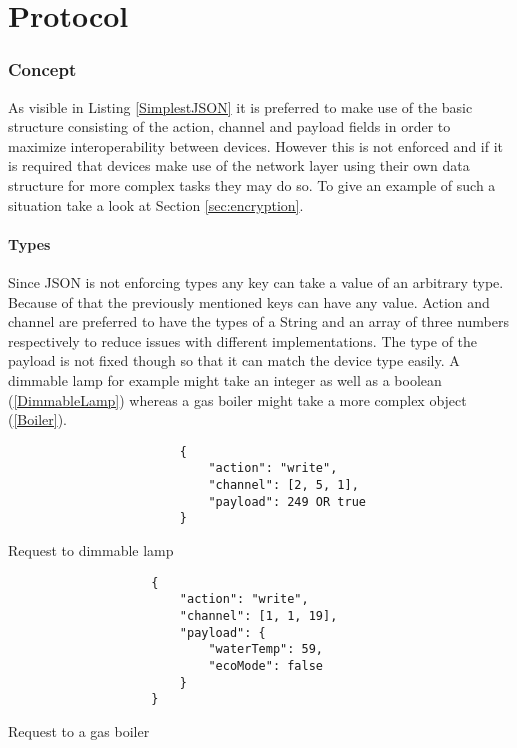 \documentclass[11pt,a4paper, titlepage]{article}
\begin{document}
	\newpage
				
	\part{Protocol}
		\label{part:protocol}
		
		\section{Concept}
			As visible in Listing \ref{SimplestJSON} it is preferred to make use of the basic structure consisting of the action, channel and payload fields in order to maximize interoperability between devices. However this is not enforced and if it is required that devices make use of the network layer using their own data structure for more complex tasks they may do so. To give an example of such a situation take a look at Section \ref{sec:encryption}.
			\subsection{Types}
				Since JSON is not enforcing types any key can take a value of an arbitrary type. Because of that the previously mentioned keys can have any value. Action and channel are preferred to have the types of a String and an array of three numbers respectively to reduce issues with different implementations. The type of the payload is not fixed though so that it can match the device type easily. A dimmable lamp for example might take an integer as well as a boolean (\ref{DimmableLamp}) whereas a gas boiler might take a more complex object (\ref{Boiler}).
				\begin{listing}
					\begin{verbatim}
						{
							"action": "write",
							"channel": [2, 5, 1],
							"payload": 249 OR true
						}
					\end{verbatim}
					\caption{Request to dimmable lamp}
					\label{DimmableLamp}
				\end{listing}
				\begin{listing}
					\begin{verbatim}
					{
						"action": "write",
						"channel": [1, 1, 19],
						"payload": {
							"waterTemp": 59,
							"ecoMode": false
						}
					}
					\end{verbatim}
					\caption{Request to a gas boiler}
					\label{Boiler}
				\end{listing} 
		
\end{document}
